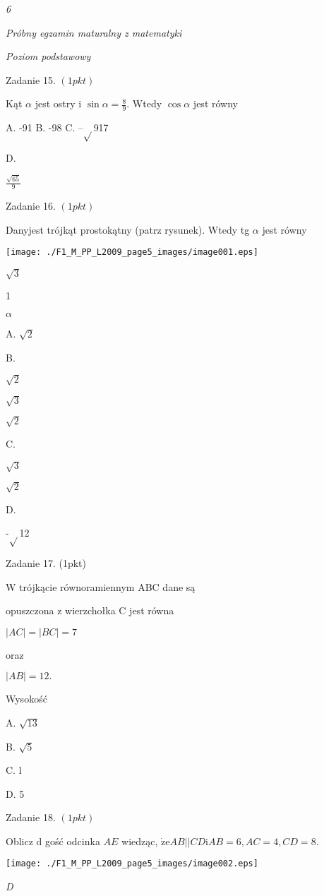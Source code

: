 \documentclass[a4paper,12pt]{article}
\begin{document}
{\it 6}

{\it Próbny egzamin maturalny z matematyki}

{\it Poziom podstawowy}

Zadanie 15. $(1pkt)$

Kąt $\alpha$ jest ostry i $\displaystyle \sin\alpha=\frac{8}{9}$. Wtedy $\cos\alpha$ jest równy

A. -91 B. -98 C. --$\sqrt{}$917

D.

$\displaystyle \frac{\sqrt{65}}{9}$

Zadanie 16. $(1pkt)$

Danyjest trójkąt prostokątny (patrz rysunek). Wtedy tg $\alpha$ jest równy
\begin{center}
\texttt{[image: ./F1\_M\_PP\_L2009\_page5\_images/image001.eps]}
\end{center}
$\sqrt{3}$

1

$\alpha$

A. $\sqrt{2}$

B.

$\sqrt{2}$

$\sqrt{3}$

$\sqrt{2}$

C.

$\sqrt{3}$

$\sqrt{2}$

D.

-$\sqrt{}$12

Zadanie 17. (1pkt)

W trójkącie równoramiennym ABC dane są

opuszczona z wierzchołka C jest równa

$|AC|=|BC|=7$

oraz

$|AB|=12.$

Wysokość

A. $\sqrt{13}$

B. $\sqrt{5}$

C. l

D. 5

Zadanie 18. $(1pkt)$

Oblicz $\mathrm{d}$ gość odcinka $AE$ wiedząc, $\dot{\mathrm{z}}\mathrm{e}AB||CD \mathrm{i} AB=6, AC=4, CD=8.$
\begin{center}
\texttt{[image: ./F1\_M\_PP\_L2009\_page5\_images/image002.eps]}
\end{center}
{\it D}
\end{document}
